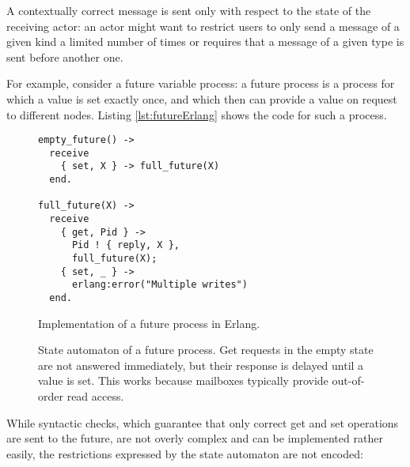 A contextually correct message is sent only with respect to the state of the receiving actor:
an actor might want to restrict users to only send a message of a given kind a limited number of times or requires that a message of a given type is sent before another one.


For example, consider a future variable process:
a future process is a process for which a value is set exactly once, and which then can provide a value on request to different nodes.
Listing \ref{lst:futureErlang} shows the code for such a process.


\begin{figure}[ht]
\begin{minipage}[c]{0.48\linewidth}
    \begin{lstlisting}
empty_future() ->
  receive
    { set, X } -> full_future(X)
  end.

full_future(X) ->
  receive
    { get, Pid } ->
      Pid ! { reply, X },
      full_future(X);
    { set, _ } ->
      erlang:error("Multiple writes")
  end.
    \end{lstlisting}
    \caption{Implementation of a future process in Erlang\cite{fowlerSpecialDeliveryProgramming2023}.}
    \label{lst:futureErlang}
\end{minipage}
\hfill
\begin{minipage}[c]{0.48\linewidth}
    \caption{
        State automaton of a future process.
        Get requests in the empty state are not answered immediately, but their response is delayed until a value is set.
        This works because mailboxes typically provide out-of-order read access.
    }
    \label{fig:futureStateAutomaton}
\end{minipage}
\end{figure}

While syntactic checks, which guarantee that only correct get and set operations are sent to the future, are not overly complex and can be implemented rather easily, the restrictions expressed by the state automaton are not encoded:

